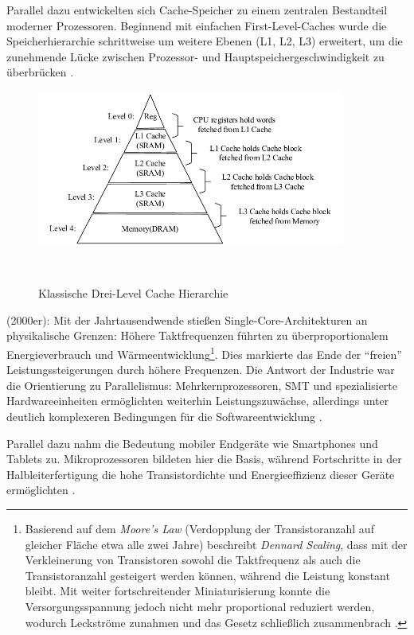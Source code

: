 Parallel dazu entwickelten sich Cache-Speicher zu einem zentralen Bestandteil moderner Prozessoren. Beginnend mit einfachen First-Level-Caches wurde die Speicherhierarchie schrittweise um weitere Ebenen (L1, L2, L3) erweitert, um die zunehmende Lücke zwischen Prozessor- und Hauptspeichergeschwindigkeit zu überbrücken \parencite[S.~2]{hennessy_computer_2011}.

\begin{figure}[htbp]
    \centering
    \includegraphics[width=0.90\textwidth]{img/Cache-Hierarchie.png}
    \caption{Klassische Drei-Level Cache Hierarchie}~\cite{gao_cspm_2022}
    \label{fig:cache_hierarchie}
\end{figure}

(2000er): Mit der Jahrtausendwende stießen Single-Core-Architekturen an physikalische Grenzen: Höhere Taktfrequenzen führten zu überproportionalem Energieverbrauch und Wärmeentwicklung\footnote{Basierend auf dem \textit{Moore’s Law} (Verdopplung der Transistoranzahl auf gleicher Fläche etwa alle zwei Jahre) beschreibt \textit{Dennard Scaling}, dass mit der Verkleinerung von Transistoren sowohl die Taktfrequenz als auch die Transistoranzahl gesteigert werden können, während die Leistung konstant bleibt. Mit weiter fortschreitender Miniaturisierung konnte die Versorgungsspannung jedoch nicht mehr proportional reduziert werden, wodurch Leckströme zunahmen und das Gesetz schließlich zusammenbrach \cite{hennessy_new_2019}.}. Dies markierte das Ende der \enquote{freien} Leistungssteigerungen durch höhere Frequenzen. Die Antwort der Industrie war die Orientierung zu Parallelismus: Mehrkernprozessoren, \ac{SMT} und spezialisierte Hardwareeinheiten ermöglichten weiterhin Leistungszuwächse, allerdings unter deutlich komplexeren Bedingungen für die Softwareentwicklung \parencites[S.~3f]{shalf_new_2007}[S.~67f]{parkhurst_single_2006}.

Parallel dazu nahm die Bedeutung mobiler Endgeräte wie Smartphones und Tablets zu. Mikroprozessoren bildeten hier die Basis, während Fortschritte in der Halbleiterfertigung die hohe Transistordichte und Energieeffizienz dieser Geräte ermöglichten \parencite[S.~2]{hennessy_computer_2011}.

